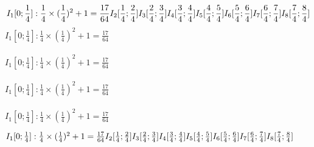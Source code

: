 \documentclass[a4paper]{report}
\begin{document}
\begin{equation}

I_1[0;\frac{1}{4}]: \frac{1}{4} \times (\frac{1}{4})^2 + 1 = \frac{17}{64}\\
\\
I_2[\frac{1}{4};\frac{2}{4}] \\
\\
I_3[\frac{2}{4};\frac{3}{4}] \\
\\
I_4[\frac{3}{4};\frac{4}{4}] \\
\\
I_5[\frac{4}{4};\frac{5}{4}] \\
\\
I_6[\frac{5}{4};\frac{6}{4}] \\
\\
I_7[\frac{6}{4};\frac{7}{4}] \\
\\
I_8[\frac{7}{4};\frac{8}{4}]
\end{equation}
$I_1[0;\frac{1}{4}]: \frac{1}{4} \times (\frac{1}{4})^2 + 1 = \frac{17}{64}$ \hfill{}
\\ \\
$I_1[0;\frac{1}{4}]: \frac{1}{4} \times (\frac{1}{4})^2 + 1 = \frac{17}{64}$
\\ \\
$I_1[0;\frac{1}{4}]: \frac{1}{4} \times (\frac{1}{4})^2 + 1 = \frac{17}{64}$
\\ \\
$I_1[0;\frac{1}{4}]: \frac{1}{4} \times (\frac{1}{4})^2 + 1 = \frac{17}{64}$

\newpage
$
\\
I_1[0;\frac{1}{4}]: \frac{1}{4} \times (\frac{1}{4})^2 + 1 = \frac{17}{64}\\
\\
I_2[\frac{1}{4};\frac{2}{4}] \\
\\
I_3[\frac{2}{4};\frac{3}{4}] \\
\\
I_4[\frac{3}{4};\frac{4}{4}] \\
\\
I_5[\frac{4}{4};\frac{5}{4}] \\
\\
I_6[\frac{5}{4};\frac{6}{4}] \\
\\
I_7[\frac{6}{4};\frac{7}{4}] \\
\\
I_8[\frac{7}{4};\frac{8}{4}]
$
\endgroup
\end{document}
